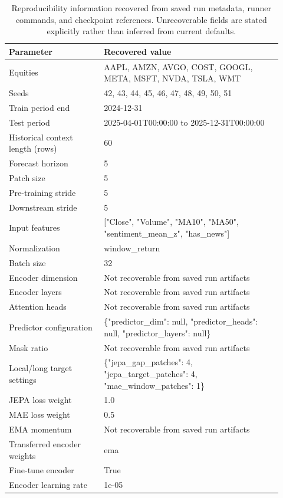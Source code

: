 \begin{table}[p]
\centering
\small
\caption{Reproducibility information recovered from saved run metadata, runner commands, and checkpoint references. Unrecoverable fields are stated explicitly rather than inferred from current defaults.}
\label{tab:reproducibility}
\begin{tabular}{p{0.32\linewidth}p{0.60\linewidth}}
\toprule
Parameter & Recovered value \\
\midrule
Equities & AAPL, AMZN, AVGO, COST, GOOGL, META, MSFT, NVDA, TSLA, WMT \\
Seeds & 42, 43, 44, 45, 46, 47, 48, 49, 50, 51 \\
Train period end & 2024-12-31 \\
Test period & 2025-04-01T00:00:00 to 2025-12-31T00:00:00 \\
Historical context length (rows) & 60 \\
Forecast horizon & 5 \\
Patch size & 5 \\
Pre-training stride & 5 \\
Downstream stride & 5 \\
Input features & ["Close", "Volume", "MA10", "MA50", "sentiment\_mean\_z", "has\_news"] \\
Normalization & window\_return \\
Batch size & 32 \\
Encoder dimension & Not recoverable from saved run artifacts \\
Encoder layers & Not recoverable from saved run artifacts \\
Attention heads & Not recoverable from saved run artifacts \\
Predictor configuration & \{"predictor\_dim": null, "predictor\_heads": null, "predictor\_layers": null\} \\
Mask ratio & Not recoverable from saved run artifacts \\
Local/long target settings & \{"jepa\_gap\_patches": 4, "jepa\_target\_patches": 4, "mae\_window\_patches": 1\} \\
JEPA loss weight & 1.0 \\
MAE loss weight & 0.5 \\
EMA momentum & Not recoverable from saved run artifacts \\
Transferred encoder weights & ema \\
Fine-tune encoder & True \\
Encoder learning rate & 1e-05 \\

\end{tabular}
\end{table}
